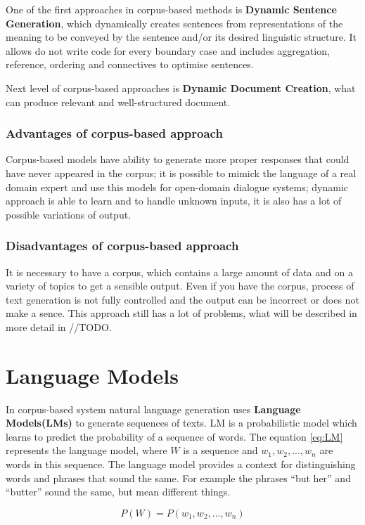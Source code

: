 One of the first approaches in corpus-based methods is \textbf{Dynamic Sentence Generation}, which dynamically creates sentences from representations of the meaning to be conveyed by the sentence and/or its desired linguistic structure. It allows do not write code for every boundary case and includes aggregation, reference, ordering and connectives to optimise sentences.

Next level of corpus-based approaches is \textbf{Dynamic Document Creation}, what can produce relevant and well-structured document. 

\subsubsection{Advantages of corpus-based approach}
Corpus-based models have ability to generate more proper responses that could have never appeared in the corpus; it is possible to mimick the language of a real domain expert and use this models for open-domain dialogue systems; dynamic approach is able to learn and to handle unknown inputs, it is also has a lot of possible variations of output.

\subsubsection{Disadvantages of corpus-based approach}
It is necessary to have a corpus, which contains a large amount of data and on a variety of topics to get a sensible output. Even if you have the corpus, process of text generation is not fully controlled and the output can be incorrect or does not make a sence. This approach still has a lot of problems, what will be described in more detail in //TODO. 

\section{Language Models}
In corpus-based system natural language generation uses \textbf{Language Models(LMs)} to generate sequences of texts. LM is a probabilistic model which learns to predict the probability of a sequence of words. The equation \ref{eq:LM} represents the language model, where $W$ is a sequence and $w_1, w_2, ..., w_n$ are words in this sequence. The language model provides a context for distinguishing words and phrases that sound the same. For example the phrases ``but her'' and  ``butter'' sound the same, but mean different things.

\begin{equation} \label{eq:LM}
P(W) = P(w_1, w_2, ..., w_n)
\end{equation}

